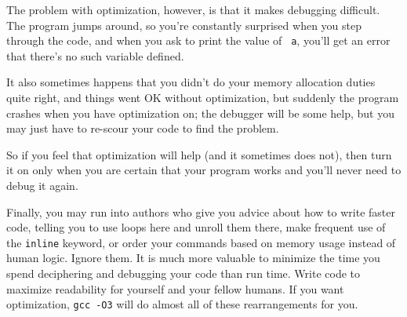 \documentclass[12pt]{article}
\begin{document}
The problem with optimization, however, is that it makes debugging
difficult. The program jumps around, so you're constantly surprised when
you step through the code, and when you ask to print the value of {\tt
a}, you'll get an error that there's no such variable defined.

It also sometimes happens that you didn't do your memory allocation duties
quite right, and things went OK without optimization, but suddenly the
program crashes when you have optimization on; the debugger will be some
help, but you may just have to re-scour your code to find the problem.

So if you feel that optimization will help (and it sometimes does not),
then turn it on only when you are certain that your program works and
you'll never need to debug it again.

Finally, you may run into authors who give you advice about how to write
faster code, telling you to use loops here and unroll them there, make
frequent use of the {\tt inline} keyword, or order your commands based
on memory usage instead of human logic. Ignore them. It is much more
valuable to minimize the time you spend deciphering and debugging your
code than run time.  Write code to maximize readability for yourself
and your fellow humans. If you want optimization, {\tt gcc -O3} will
do almost all of these rearrangements for you.

\label{end_c_crash}
\ifbook \else
\printindex
\end{document}
